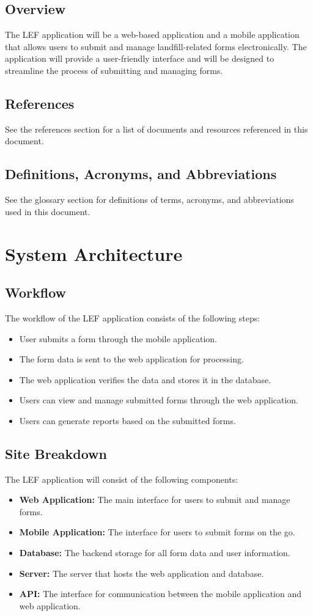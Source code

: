 \documentclass[12pt]{article}
\begin{document}
\subsection{Overview}
The LEF application will be a web-based application and a mobile application that allows users to submit and manage landfill-related forms electronically. The application will provide a user-friendly interface and will be designed to streamline the process of submitting and managing forms.
\subsection{References}
See the references section for a list of documents and resources referenced in this document.
\subsection{Definitions, Acronyms, and Abbreviations}
See the glossary section for definitions of terms, acronyms, and abbreviations used in this document.
\newpage

\section{System Architecture}
\subsection{Workflow}
The workflow of the LEF application consists of the following steps:
\begin{itemize}
    \item User submits a form through the mobile application.
    \item The form data is sent to the web application for processing.
    \item The web application verifies the data and stores it in the database.
    \item Users can view and manage submitted forms through the web application.
    \item Users can generate reports based on the submitted forms.
\end{itemize}
\subsection{Site Breakdown}
The LEF application will consist of the following components:
\begin{itemize}
    \item \textbf{Web Application:} The main interface for users to submit and manage forms.
    \item \textbf{Mobile Application:} The interface for users to submit forms on the go.
    \item \textbf{Database:} The backend storage for all form data and user information.
    \item \textbf{Server:} The server that hosts the web application and database.
    \item \textbf{API:} The interface for communication between the mobile application and web application.
\end{itemize}
\end{document}
